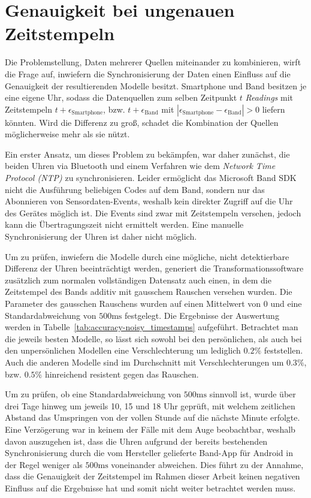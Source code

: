 \section{Genauigkeit bei ungenauen Zeitstempeln}
Die Problemstellung, Daten mehrerer Quellen miteinander zu kombinieren, wirft die Frage auf, inwiefern die Synchronisierung der Daten einen Einfluss auf die Genauigkeit der resultierenden Modelle besitzt. Smartphone und Band besitzen je eine eigene Uhr, sodass die Datenquellen zum selben Zeitpunkt $t$ \textit{Readings} mit Zeitstempeln $t + \epsilon_\text{Smartphone}$, bzw. $t + \epsilon_\text{Band}$ mit $|\epsilon_\text{Smartphone} - \epsilon_\text{Band}| > 0$ liefern könnten. Wird die Differenz zu groß, schadet die Kombination der Quellen möglicherweise mehr als sie nützt.

Ein erster Ansatz, um dieses Problem zu bekämpfen, war daher zunächst, die beiden Uhren via Bluetooth und einem Verfahren wie dem \textit{Network Time Protocol (NTP)} \cite{Mills} zu synchronisieren. Leider ermöglicht das Microsoft Band SDK nicht die Ausführung beliebigen Codes auf dem Band, sondern nur das Abonnieren von Sensordaten-Events, weshalb kein direkter Zugriff auf die Uhr des Gerätes möglich ist. Die Events sind zwar mit Zeitstempeln versehen, jedoch kann die Übertragungszeit nicht ermittelt werden. Eine manuelle Synchronisierung der Uhren ist daher nicht möglich.

Um zu prüfen, inwiefern die Modelle durch eine mögliche, nicht detektierbare Differenz der Uhren beeinträchtigt werden, generiert die Transformationssoftware zusätzlich zum normalen vollständigen Datensatz auch einen, in dem die Zeitstempel des Bands additiv mit gausschem Rauschen versehen wurden. Die Parameter des gausschen Rauschens wurden auf einen Mittelwert von $0$ und eine Standardabweichung von $500 \text{ms}$ festgelegt. Die Ergebnisse der Auswertung werden in Tabelle~\ref{tab:accuracy-noisy_timestamps} aufgeführt. Betrachtet man die jeweils besten Modelle, so lässt sich sowohl bei den persönlichen, als auch bei den unpersönlichen Modellen eine Verschlechterung um lediglich $0.2 \%$ feststellen. Auch die anderen Modelle sind im Durchschnitt mit Verschlechterungen um $0.3 \%$, bzw. $0.5 \%$ hinreichend resistent gegen das Rauschen.

Um zu prüfen, ob eine Standardabweichung von $500 \text{ms}$ sinnvoll ist, wurde über drei Tage hinweg um jeweils 10, 15 und 18 Uhr geprüft, mit welchem zeitlichen Abstand das Umspringen von der vollen Stunde auf die nächste Minute erfolgte. Eine Verzögerung war in keinem der Fälle mit dem Auge beobachtbar, weshalb davon auszugehen ist, dass die Uhren aufgrund der bereits bestehenden Synchronisierung durch die vom Hersteller gelieferte Band-App für Android in der Regel weniger als $500 \text{ms}$ voneinander abweichen. Dies führt zu der Annahme, dass die Genauigkeit der Zeitstempel im Rahmen dieser Arbeit keinen negativen Einfluss auf die Ergebnisse hat und somit nicht weiter betrachtet werden muss.

